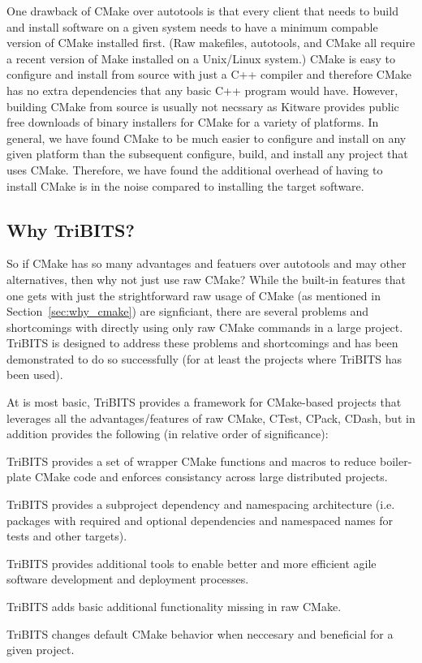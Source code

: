 \documentclass[10pt]{article}
\begin{document}
One drawback of CMake over autotools is that every client that needs to build and install software on a given system needs to have a minimum compable version of CMake installed first.  (Raw makefiles, autotools, and CMake all require a recent version of Make installed on a Unix/Linux system.)  CMake is easy to configure and install from source with just a C++ compiler and therefore CMake has no extra dependencies that any basic C++ program would have.  However, building CMake from source is usually not necssary as Kitware provides public free downloads of binary installers for CMake for a variety of platforms.  In general, we have found CMake to be much easier to configure and install on any given platform than the subsequent configure, build, and install any project that uses CMake.  Therefore, we have found the additional overhead of having to install CMake is in the noise compared to installing the target software.

%
\subsection{Why TriBITS?}
%

So if CMake has so many advantages and featuers over autotools and may other alternatives, then why not just use raw CMake?  While the built-in features that one gets with just the strightforward raw usage of CMake (as mentioned in Section~\ref{sec:why_cmake}) are signficiant, there are several problems and shortcomings with directly using only raw CMake commands in a large project.  TriBITS is designed to address these problems and shortcomings and has been demonstrated to do so successfully (for at least the projects where TriBITS has been used).

At is most basic, TriBITS provides a framework for CMake-based projects that leverages all the advantages/features of raw CMake, CTest, CPack, CDash, but in addition provides the following (in relative order of significance):

\begin{compactitem}
\item TriBITS provides a set of wrapper CMake functions and macros to reduce boiler-plate CMake code and enforces consistancy across large distributed projects.
\item TriBITS provides a subproject dependency and namespacing architecture (i.e. packages with required and optional dependencies and namespaced names for tests and other targets).
\item TriBITS provides additional tools to enable better and more efficient agile software development and deployment processes.
\item TriBITS adds basic additional functionality missing in raw CMake.
\item TriBITS changes default CMake behavior when neccesary and beneficial for a given project.
\end{compactitem}
\end{document}
